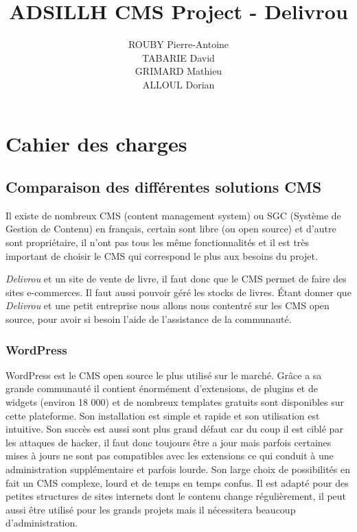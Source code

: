 \documentclass[a4paper,12pt]{report}
\title{ADSILLH CMS Project - Delivrou}
\author{ROUBY Pierre-Antoine \\ TABARIE David \\ GRIMARD Mathieu \\
  ALLOUL Dorian}
\begin{document}
\maketitle
\tableofcontents

\begin{abstract}
\end{abstract}

\part{Cahier des charges}
\chapter{Comparaison des différentes solutions CMS}

Il existe de nombreux CMS (content management system) ou SGC (Système
de Gestion de Contenu) en français, certain sont libre (ou open source)
et d'autre sont propriétaire, il n'ont pas tous les même fonctionnalités
et il est très important de choisir le CMS qui correspond le plus aux
besoins du projet.

\textit{Delivrou} et un site de vente de livre, il faut donc que le CMS
permet de faire des sites e-commerces. Il faut aussi pouvoir géré les
stocks de livres. Étant donner que \textit{Delivrou} et une petit
entreprise nous allons nous contentré sur les CMS open source, pour
avoir si besoin l'aide de l'assistance de la communauté.

\section{WordPress}

WordPress est le CMS open source le plus utilisé sur le marché. Grâce
a sa grande communauté il contient énormément d’extensions, de plugins
et de widgets (environ 18 000) et de nombreux templates gratuits sont
disponibles sur cette plateforme. Son installation est simple et
rapide et son utilisation est intuitive.  Son succès est aussi sont
plus grand défaut car du coup il est ciblé par les attaques de hacker,
il faut donc toujours être a jour mais parfois certaines mises à jours
ne sont pas compatibles avec les extensions ce qui conduit à une
administration supplémentaire et parfois lourde. Son large choix de
possibilités en fait un CMS complexe, lourd et de temps en temps
confus.  Il est adapté pour des petites structures de sites internets
dont le contenu change régulièrement, il peut aussi être utilisé pour
les grands projets mais il nécessitera beaucoup d'administration.
\end{document}
